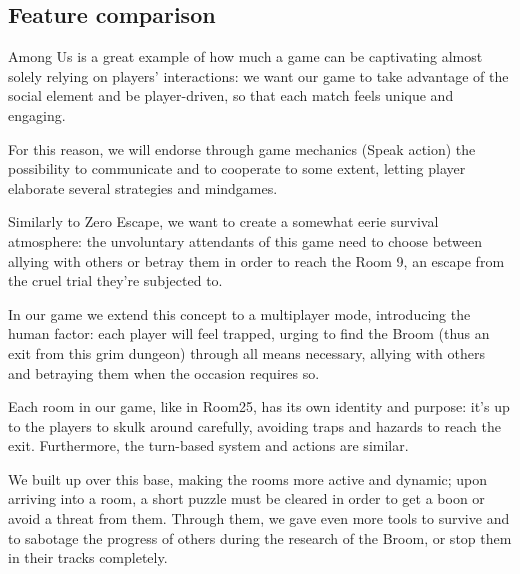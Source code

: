 \subsection{Feature comparison}


Among Us is a great example of how much a game can be captivating almost solely relying on players' interactions: we want our game to take advantage of the social element and be player-driven, so that each match feels unique and engaging.


\noindent For this reason, we will endorse through game mechanics (Speak action) the possibility to communicate and to cooperate to some extent, letting player elaborate several strategies and mindgames.

\clearpage
{} 

Similarly to Zero Escape, we want to create a somewhat eerie survival atmosphere: the unvoluntary attendants of this game need to choose between allying with others or betray them in order to reach the Room 9, an escape from the cruel trial they're subjected to.


\noindent In our game we extend this concept to a multiplayer mode, introducing the human factor: each player will feel trapped, urging to find the Broom (thus an exit from this grim dungeon) through all means necessary, allying with others and betraying them when the occasion requires so.

\clearpage
{}

Each room in our game, like in Room25, has its own identity and purpose: it's up to the players to skulk around carefully, avoiding traps and hazards to reach the exit. Furthermore, the turn-based system and actions are similar.


\noindent We built up over this base, making the rooms more active and dynamic; upon arriving into a room, a short puzzle must be cleared in order to get a boon or avoid a threat from them. Through them, we gave even more tools to survive and to sabotage the progress of others during the research of the Broom, or stop them in their tracks completely.
